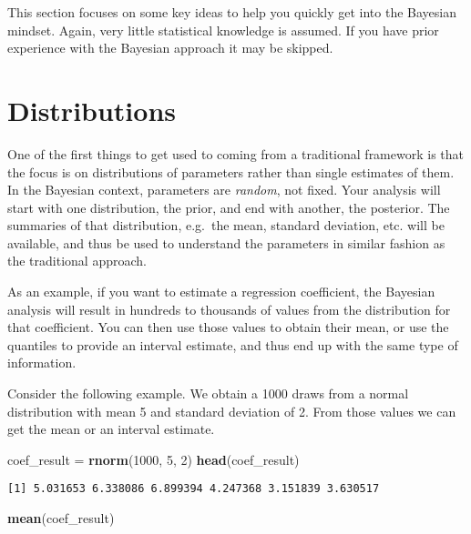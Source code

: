 \documentclass[]{book}
\newenvironment{Shaded}{\begin{snugshade}}{\end{snugshade}}
\newcommand{\KeywordTok}[1]{\textcolor[rgb]{0.13,0.29,0.53}{\textbf{{#1}}}}
\newcommand{\DecValTok}[1]{\textcolor[rgb]{0.00,0.00,0.81}{{#1}}}
\newcommand{\StringTok}[1]{\textcolor[rgb]{0.31,0.60,0.02}{{#1}}}
\newcommand{\NormalTok}[1]{{#1}}
\begin{document}
This section focuses on some key ideas to help you quickly get into the
Bayesian mindset. Again, very little statistical knowledge is assumed.
If you have prior experience with the Bayesian approach it may be
skipped.

\section{Distributions}\label{distributions}

One of the first things to get used to coming from a traditional
framework is that the focus is on distributions of parameters rather
than single estimates of them. In the Bayesian context, parameters are
{\emph{random}}, not fixed. Your analysis will start with one
distribution, the {prior}, and end with another, the {posterior}. The
summaries of that distribution, e.g.~the mean, standard deviation, etc.
will be available, and thus be used to understand the parameters in
similar fashion as the traditional approach.

As an example, if you want to estimate a regression coefficient, the
Bayesian analysis will result in hundreds to thousands of values from
the distribution for that coefficient. You can then use those values to
obtain their mean, or use the quantiles to provide an interval estimate,
and thus end up with the same type of information.

Consider the following example. We obtain a 1000 draws from a normal
distribution with mean 5 and standard deviation of 2. From those values
we can get the mean or an interval estimate.

\begin{Shaded}
\begin{Highlighting}[]
\NormalTok{coef_result =}\StringTok{ }\KeywordTok{rnorm}\NormalTok{(}\DecValTok{1000}\NormalTok{, }\DecValTok{5}\NormalTok{, }\DecValTok{2}\NormalTok{)}
\KeywordTok{head}\NormalTok{(coef_result)}
\end{Highlighting}
\end{Shaded}

\begin{verbatim}
[1] 5.031653 6.338086 6.899394 4.247368 3.151839 3.630517
\end{verbatim}

\begin{Shaded}
\begin{Highlighting}[]
\KeywordTok{mean}\NormalTok{(coef_result)}
\end{Highlighting}
\end{Shaded}
\end{document}
